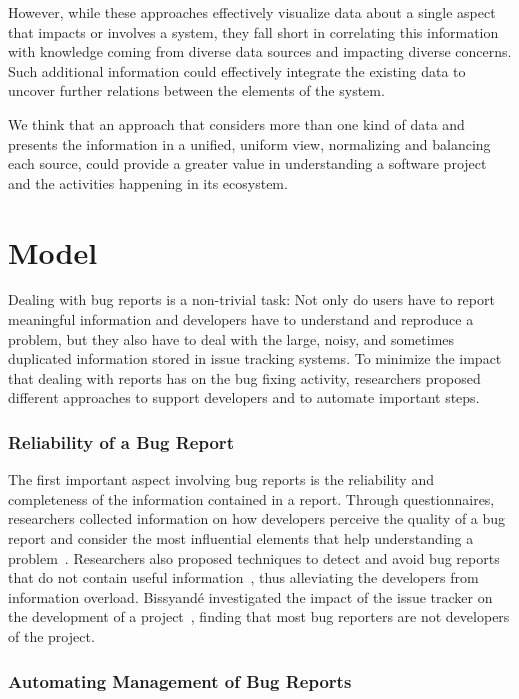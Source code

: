However, while these approaches effectively visualize data about a single aspect that impacts or involves a system, they fall short in correlating this information with knowledge coming from diverse data sources and impacting diverse concerns.
Such additional information could effectively integrate the existing data to uncover further relations between the elements of the system.

We think that an approach that considers more than one kind of data and presents the information in a unified, uniform view, normalizing and balancing each source, could provide a greater value in understanding a software project and the activities happening in its ecosystem.




\section{Model} \label{sec:related-model}

Dealing with bug reports is a non-trivial task: Not only do users have to report meaningful information and developers have to understand and reproduce a problem, but they also have to deal with the large, noisy, and sometimes duplicated  information stored in issue tracking systems.
To minimize the impact that dealing with reports has on the bug fixing activity, researchers proposed different approaches to support developers and to automate important steps.


\subsubsection{Reliability of a Bug Report}

The first important aspect involving bug reports is the reliability and completeness of the information contained in a report.
Through questionnaires, researchers collected information on how developers perceive the quality of a bug report and consider the most influential elements that help understanding a problem~\cite{Zimm2010a,Bett2007,Schr2010a}.
Researchers also proposed techniques to detect and avoid bug reports that do not contain useful information~\cite{Sun2011}, thus alleviating the developers from information overload.
Bissyand\'e \etal investigated the impact of the issue tracker on the development of a project~\cite{Biss2013}, finding that most bug reporters are not developers of the project.


\subsubsection{Automating Management of Bug Reports}


